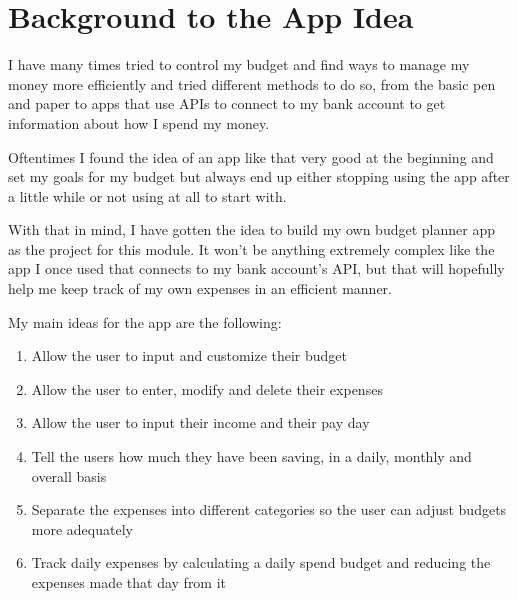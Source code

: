 \chapter{Background to the App Idea}
I have many times tried to control my budget and find ways to manage my money more efficiently and tried different methods to do so, from the basic pen and paper to apps that use APIs to connect to my bank account to get information about how I spend my money.

Oftentimes I found the idea of an app like that very good at the beginning and set my goals for my budget but always end up either stopping using the app after a little while or not using at all to start with.

With that in mind, I have gotten the idea to build my own budget planner app as the project for this module. It won't be anything extremely complex like the app I once used that connects to my bank account's API, but that will hopefully help me keep track of my own expenses in an efficient manner.

My main ideas for the app are the following:
\begin{enumerate}
  \item Allow the user to input and customize their budget
  \item Allow the user to enter, modify and delete their expenses
  \item Allow the user to input their income and their pay day
  \item Tell the users how much they have been saving, in a daily, monthly and overall basis
  \item Separate the expenses into different categories so the user can adjust budgets more adequately
  \item Track daily expenses by calculating a daily spend budget and reducing the expenses made that day from it
\end{enumerate}
